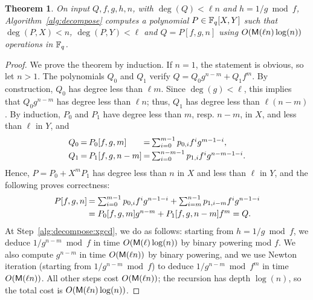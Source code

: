 \documentclass{sig-alternate}
\newtheorem{theorem}[definition]{Theorem}
\begin{document}
\begin{theorem}
  On input $Q,f,g,h,n$, with $\deg(Q) < \ell n$ and $h = 1/g \bmod f$,
  Algorithm~\ref{alg:decompose} computes a polynomial $P\in \mathbb{F}_q[X,Y]$
  such that $\deg(P,X)<n$, $\deg(P,Y) <\ell$ and $Q=P[f,g,n]$ using
  $O(\mathsf{M}(\ell n)\log(n))$ operations in $\mathbb{F}_q$.
\end{theorem}
\begin{proof}
  We prove the theorem by induction. If $n=1$, the statement is
  obvious, so let $n> 1$. The polynomials $Q_0$ and $Q_1$ verify $Q =
  Q_0g^{n-m} + Q_1f^m.$ By construction, $Q_0$ has degree less than $\ell
  m$. Since $\deg(g) < \ell$, this implies that $Q_0 g^{n-m}$ has
  degree less than $\ell n$; thus, $Q_1$ has degree less than $\ell
  (n-m)$. By induction, $P_0$ and $P_1$ have degree less than $m$,
  resp. $n-m$, in $X$, and less than  $\ell$ in $Y$, and
  \begin{equation*}
    \setlength{\arraycolsep}{1pt}
    \begin{array}{lllll}
      Q_0 & = & P_0[f,g,m] & = & \sum_{i=0}^{m-1} p_{0,i}f^ig^{m-1-i},\vspace*{1mm}\\
      Q_1 & = & P_1[f,g,n-m] & = & \sum_{i=0}^{n-m-1} p_{1,i}f^ig^{n-m-1-i}.
    \end{array}
  \end{equation*}
  Hence, $P=P_0+X^mP_1$ has degree less than $n$ in $X$ and less than $\ell$ 
  in $Y$, and the following proves correctness:
  \[
  \setlength{\arraycolsep}{1pt}
  \begin{array}{ll}
    P[f,g,n] & = \sum_{i=0}^{m-1}p_{0,i}f^ig^{n-1-i} + 
    \sum_{i=m}^{n-1}p_{1,i-m}f^ig^{n-1-i} \vspace*{1mm}\\
    & =P_0[f,g,m]g^{n-m} + P_1[f,g,n-m]f^m = Q.
  \end{array}
  \]
  At Step~\ref{alg:decompose:xgcd}, we do as follows: starting from
  $h=1/g \bmod f$, we deduce $1/g^{n-m} \bmod f$ in time
  $O(\mathsf{M}(\ell)\log(n))$ by binary powering mod $f$. We also compute
  $g^{n-m}$ in time $O(\mathsf{M}(\ell n))$ by binary powering, and we use
  Newton iteration (starting from $1/g^{n-m} \bmod f$) to deduce
  $1/g^{n-m} \bmod f^m$ in time $O(\mathsf{M}(\ell n))$. All other steps
  cost $O(\mathsf{M}(\ell n))$; the recursion has depth $\log(n)$,
  so the total cost is $O(\mathsf{M}(\ell n)\log(n))$.
\end{proof}
\end{document}
